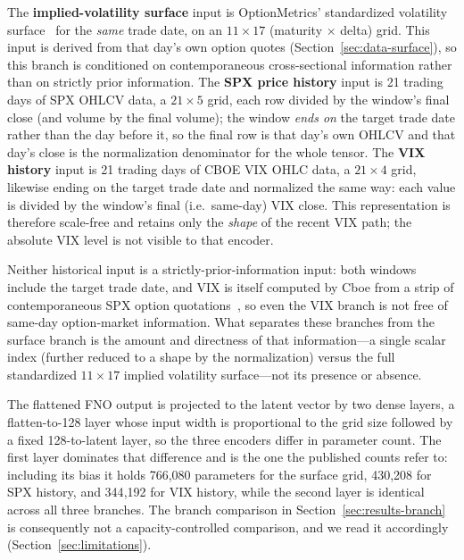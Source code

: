 \documentclass[11pt]{article}
\begin{document}
The \textbf{implied-volatility surface} input is OptionMetrics' standardized volatility
surface~\citep{OptionMetrics2026Surface} for the \emph{same} trade date, on an $11 \times 17$ (maturity
$\times$ delta) grid. This input is derived from that day's own option quotes
(Section~\ref{sec:data-surface}), so this branch is conditioned on contemporaneous cross-sectional
information rather than on strictly prior information. The \textbf{SPX price history} input is 21
trading days of SPX OHLCV data, a $21 \times 5$ grid, each row divided by the window's final close (and
volume by the final volume); the window \emph{ends on} the target trade date rather than the day
before it, so the final row is that day's own OHLCV and that day's close is the normalization
denominator for the whole tensor. The \textbf{VIX history} input is 21 trading days of CBOE VIX OHLC
data, a $21 \times 4$ grid, likewise ending on the target trade date and normalized the same way: each
value is divided by the window's final (i.e.\ same-day) VIX close. This representation is therefore
scale-free and retains only the \emph{shape} of the recent VIX path; the absolute VIX level is not
visible to that encoder.

Neither historical input is a strictly-prior-information input: both windows include the target trade
date, and VIX is itself computed by Cboe from a strip of contemporaneous SPX option
quotations~\citep{Cboe2026VIXFAQ}, so even the VIX branch is not free of same-day option-market information. What
separates these branches from the surface branch is the amount and directness of that information---a
single scalar index (further reduced to a shape by the normalization) versus the full standardized
$11 \times 17$ implied volatility surface---not its presence or absence.

The flattened FNO output is projected to the latent vector by two dense layers, a flatten-to-128 layer
whose input width is proportional to the grid size followed by a fixed 128-to-latent layer, so the
three encoders differ in parameter count. The first layer dominates that difference and is the one the
published counts refer to: including its bias it holds 766{,}080 parameters for the surface grid,
430{,}208 for SPX history, and 344{,}192 for VIX history, while the second layer is identical across
all three branches. The branch comparison in Section~\ref{sec:results-branch} is consequently not a
capacity-controlled comparison, and we read it accordingly (Section~\ref{sec:limitations}).
\end{document}
